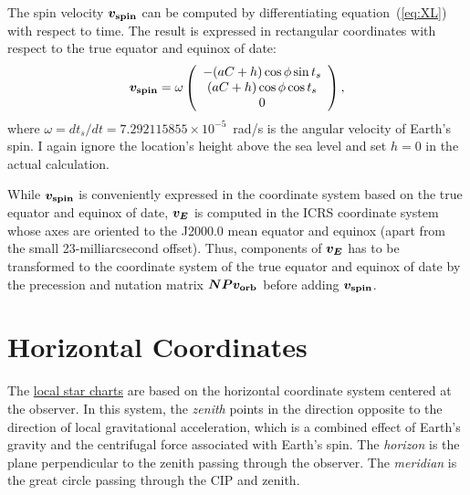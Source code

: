 \documentclass[12pt]{article}
\newcommand \beq {\begin{equation}}
\newcommand \eeq {\end{equation}}
\newcommand{\ve}[1]{\mbox{\boldmath $#1$}}
\begin{document}
The spin velocity $\ve{v_{\rm spin}}$ can be computed by differentiating 
equation~(\ref{eq:XL}) with respect to time. The result is expressed 
in rectangular coordinates with respect to the true equator and equinox of date:
\beq
  \ve{v_{\rm spin}} = \omega \left( \begin{array}{c} 
 -(aC +h) \cos \phi \sin t_s \\ (aC+h) \cos \phi \cos t_s \\ 0 \end{array} \right) ,
\label{eq:vspin}
\eeq
where $\omega=dt_s/dt = 7.292115855\times 10^{-5}$~rad/s is the angular velocity 
of Earth's spin. I again ignore the location's height above the sea level and 
set $h=0$ in the actual calculation. 

While $\ve{v_{\rm spin}}$ is conveniently expressed in the coordinate system based 
on the true equator and equinox of date, $\ve{v_E}$ is computed in 
the ICRS coordinate system whose axes are oriented to the J2000.0 mean equator 
and equinox (apart from the small 23-milliarcsecond offset). Thus, 
components of $\ve{v_E}$ has to be 
transformed to the coordinate system of the true equator and equinox of date 
by the precession and nutation matrix $\ve{N P v_{\rm orb}}$ before adding 
$\ve{v_{\rm spin}}$.

\section{Horizontal Coordinates}

The \href{../sidereal.html}{local star charts} are based on the horizontal 
coordinate system centered at the observer. In this system, the {\em zenith} 
points in the direction opposite to the direction of local gravitational 
acceleration, which is a combined effect of Earth's gravity and the centrifugal 
force associated with Earth's spin. The {\em horizon} is the plane 
perpendicular to the zenith passing through the observer. The {\em meridian} 
is the great circle passing through the CIP and zenith.
\end{document}
